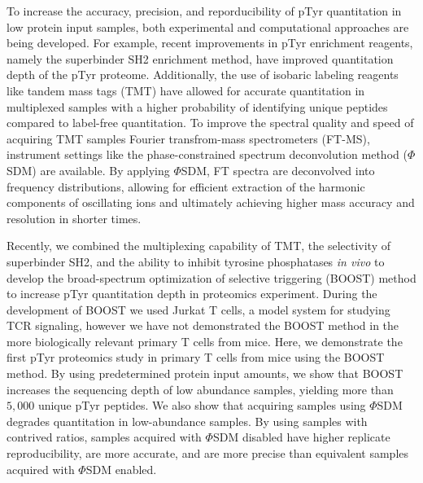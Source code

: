 \documentclass[journal=jprobs,manuscript=article]{achemso}
\begin{document}



To increase the accuracy, precision, and reporducibility of pTyr quantitation in low protein input samples, both experimental and computational approaches are being developed. For example, recent improvements in pTyr enrichment reagents, namely the superbinder SH2 enrichment method\cite{kaneko2012superbinder,bian2016ultra,dong2017sensitive,tong2017protein,yao2018sh2,yao2019one}, have improved quantitation depth of the pTyr proteome\cite{chua2020tandem,chua2021ovalbumin,griffith2021silac}. Additionally, the use of isobaric labeling reagents like tandem mass tags (TMT) have allowed for accurate quantitation in multiplexed samples with a higher probability of identifying unique peptides compared to label-free quantitation\cite{thompson2003tandem,wiese2007protein,werner2012high,mcalister2012increasing,o2018proteome,thompson2019tmtpro}. To improve the spectral quality and speed of acquiring TMT samples Fourier transfrom-mass spectrometers (FT-MS), instrument settings like the phase-constrained spectrum deconvolution method ($\Phi$SDM) are available. By applying $\Phi$SDM, FT spectra are deconvolved into frequency distributions, allowing for efficient extraction of the harmonic components of oscillating ions and ultimately achieving higher mass accuracy and resolution in shorter times\cite{grinfeld2017phase}.


Recently, we combined the multiplexing capability of TMT, the selectivity of superbinder SH2, and the ability to inhibit tyrosine phosphatases \textit{in vivo} to develop the broad-spectrum optimization of selective triggering (BOOST) method to increase pTyr quantitation depth in proteomics experiment\cite{chua2020tandem}. During the development of BOOST we used Jurkat T cells, a model system for studying TCR signaling\cite{abraham2004jurkat}, however we have not demonstrated the BOOST method in the more biologically relevant primary T cells from mice. Here, we demonstrate the first pTyr proteomics study in primary T cells from mice using the BOOST method. By using predetermined protein input amounts, we show that BOOST increases the sequencing depth of low abundance samples, yielding more than $5{,}000$ unique pTyr peptides. We also show that acquiring samples using $\Phi$SDM degrades quantitation in low-abundance samples. By using samples with contrived ratios, samples acquired with $\Phi$SDM disabled have higher replicate reproducibility, are more accurate, and are more precise than equivalent samples acquired with $\Phi$SDM enabled.
\end{document}
